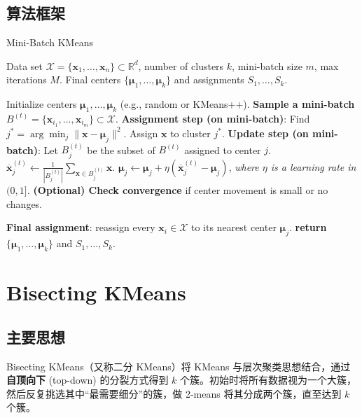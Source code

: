 \documentclass[12pt]{article}  %
\begin{document}
\subsection{算法框架}
\begin{algorithm}[H]
  \caption{Mini-Batch KMeans}
  \begin{algorithmic}[1]
    \Require Data set $\mathcal{X} = \{\mathbf{x}_1,\dots,\mathbf{x}_n\}\subset \mathbb{R}^d$, 
      number of clusters $k$, mini-batch size $m$, max iterations $M$.
    \Ensure Final centers $\{\boldsymbol{\mu}_1,\dots,\boldsymbol{\mu}_k\}$ and assignments $S_1,\dots,S_k$.

    \vspace{6pt}
    \State Initialize centers $\boldsymbol{\mu}_1,\dots,\boldsymbol{\mu}_k$ (e.g., random or KMeans++).
      \State \textbf{Sample a mini-batch} $B^{(t)} = \{\mathbf{x}_{i_1},\dots,\mathbf{x}_{i_m}\} \subset \mathcal{X}$.
      \State \textbf{Assignment step (on mini-batch)}:
            \State Find $j^* = \arg\min_{j} \|\mathbf{x} - \boldsymbol{\mu}_j\|^2$.
            \State Assign $\mathbf{x}$ to cluster $j^*$.
        \EndFor
      \State \textbf{Update step (on mini-batch)}:
          \State Let $B_j^{(t)}$ be the subset of $B^{(t)}$ assigned to center $j$.
            \State $\overline{\mathbf{x}}_{j}^{(t)} \gets \frac{1}{|B_j^{(t)}|} \sum_{\mathbf{x}\in B_j^{(t)}} \mathbf{x}$.
            \State $\boldsymbol{\mu}_j \gets \boldsymbol{\mu}_j + \eta\left(\overline{\mathbf{x}}_{j}^{(t)} - \boldsymbol{\mu}_j\right)$,
            \State \quad \textit{where $\eta$ is a learning rate in $(0,1]$.}
          \EndIf
        \EndFor
      \State \textbf{(Optional) Check convergence} if center movement is small or no changes.
    \EndFor

    \State \textbf{Final assignment}: reassign every $\mathbf{x}_i\in \mathcal{X}$ to its nearest center $\boldsymbol{\mu}_j$.
    \State \textbf{return} $\{\boldsymbol{\mu}_1,\dots,\boldsymbol{\mu}_k\}$ and $S_1,\dots,S_k$.
  \end{algorithmic}
\end{algorithm}

\section{Bisecting KMeans}

\subsection{主要思想}
Bisecting KMeans（又称二分 KMeans）将 KMeans 与层次聚类思想结合，通过 \textbf{自顶向下} (top-down) 的分裂方式得到 $k$ 个簇。初始时将所有数据视为一个大簇，然后反复挑选其中“最需要细分”的簇，做 2-means 将其分成两个簇，直至达到 $k$ 个簇。
\end{document}
